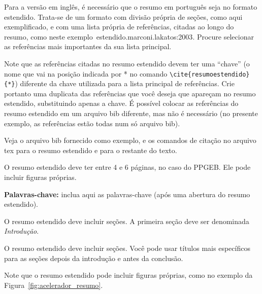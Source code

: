 \documentclass[a4paper, 12pt]{ppgeb}
\begin{document}
Para a versão em inglês, é necessário que o resumo em português seja no formato estendido. Trata-se de um formato com divisão própria de seções, como aqui exemplificado, e com uma lista própria de referências, citadas ao longo do resumo, como neste exemplo~\cite{resumoestendido}{estendido.marconi.lakatos:2003}. Procure selecionar as referências mais importantes da sua lista principal.

Note que as referências citadas no resumo estendido devem ter uma ``chave'' (o nome que vai na posição indicada  por * no comando \verb|\cite{resumoestendido}{*}|) diferente da chave utilizada para a lista principal de referências. Crie portanto uma duplicata das referências que você deseja que apareçam no resumo estendido, substituindo apenas a chave. É possível colocar as referências do resumo estendido em um arquivo bib diferente, mas não é necessário (no presente exemplo, as referências estão todas num só arquivo bib).

Veja o arquivo bib fornecido como exemplo, e os comandos de citação no arquivo tex para o resumo estendido e para o restante do texto.

O resumo estendido deve ter entre 4 e 6 páginas, no caso do PPGEB. Ele pode incluir figuras próprias.

\vspace{14pt}

\noindent\textbf{Palavras-chave: }inclua aqui as palavras-chave (após uma abertura do resumo estendido).

O resumo estendido deve incluir seções. A primeira seção deve ser denominada \emph{Introdução}.

O resumo estendido deve incluir seções. Você pode usar títulos mais específicos para as seções depois da introdução e antes da conclusão.

Note que o resumo estendido pode incluir figuras próprias, como no exemplo da Figura~\ref{fig:acelerador_resumo}.
\end{document}
